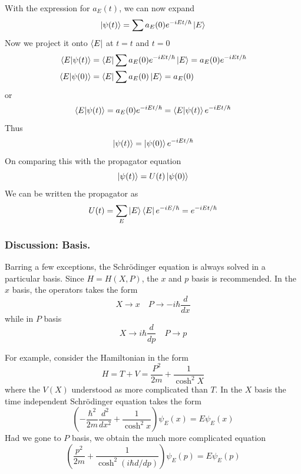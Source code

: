 \documentclass[../../../main.tex]{subfiles}
\begin{document}
With the expression for $a_E(t)$, we can now expand
\begin{equation*}
    \ket{\psi(t)}=\sum a_E(0)e^{-i E t/\hbar}\ket{E}
\end{equation*}
Now we project it onto $\bra{E }$ at $t=t$ and $t=0$
\begin{align*}
    \braket{E|\psi(t)} & = \bra{E }\sum a_E(0)e^{-i E t/\hbar}\ket{E}=a_E(0)e^{-i Et/\hbar} \\
    \braket{E|\psi(0)} & = \bra{E }\sum a_E(0)\ket{E}=a_E(0)
\end{align*}
or
\begin{equation*}
    \braket{E|\psi(t)}=a_E(0)e^{-i Et/\hbar}=\braket{E|\psi(t)}e^{-iEt/\hbar}
\end{equation*}
Thus
\begin{equation*}
    \ket{\psi(t)}=\ket{\psi(0)}e^{-iEt/\hbar}
\end{equation*}
On comparing this with the propagator equation
\begin{equation*}
    \ket{\psi(t)}=U(t)\ket{\psi(0)}
\end{equation*}
We can be written the propagator as
\begin{equation*}
    U(t)=\sum_E \ket{E }\bra{E }e^{-iE/\hbar}=e^{-iEt/\hbar}
\end{equation*}

\subsubsection{Discussion: Basis.}
Barring a few exceptions, the Schrödinger equation is always solved in a particular basis.
Since $H=H(X,P)$, the $x$ and $p$ basis is recommended.
In the $x$ basis, the operators takes the form
\begin{equation*}
    X \rightarrow x \quad P \rightarrow -i \hbar \frac{d }{dx}
\end{equation*}
while in $P$ basis
\begin{equation*}
    X \rightarrow i \hbar \frac{d }{dp}\quad P \rightarrow p
\end{equation*}

For example, consider the Hamiltonian in the form
\begin{equation*}
    H=T+V=\frac{P^2 }{2m }+\frac{1 }{\cosh^2 X}
\end{equation*}
where the $V(X)$ understood as more complicated than $T$.
In the $X$ basis the time independent Schrödinger equation takes the form
\begin{equation*}
    \left( -\frac{\hbar^2 }{2m }\frac{d^2 }{dx^2 }+\frac{1 }{\cosh^2 x} \right) \psi_E(x)=E\psi_E(x)
\end{equation*}
Had we gone to $P$ basis, we obtain the much more complicated equation
\begin{equation*}
    \left( \frac{p^2 }{2m }+\frac{1 }{\cosh^2 (i \hbar d/dp)} \right) \psi_E(p)=E\psi_E(p)
\end{equation*}
\end{document}
